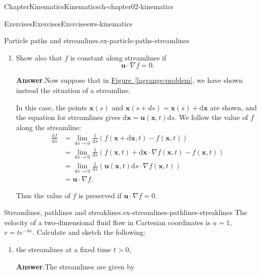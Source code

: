 \documentclass[oneside,10pt,]{book}
\newcommand{\blocktitlefont}{\relax}
\newcommand{\xreffont}{\relax}
\numberwithin{equation}{section}
\newcommand{\de}{\mathrm{d}}
\newcommand{\dd}[2]{\frac{\de#1}{\de#2}}
\newcommand{\DD}[2]{\frac{\mathrm{D}#1}{\mathrm{D}#2}}
\newcommand{\pd}[2]{\frac{\partial#1}{\partial#2}}
\newcommand{\bx}{\boldsymbol{x}}
\newcommand{\bu}{\boldsymbol{u}}
\begin{document}
\begin{chapterptx}{Chapter}{Kinematics}{}{Kinematics}{}{}{ch-chapter02-kinematics}
\begin{exercises-section}{Exercises}{Exercises}{}{Exercises}{}{}{ws-kinematics}
\begin{divisionexercise}{5}{Particle paths and streamlines.}{}{ex-particle-paths-streamlines}
\begin{enumerate}[font=\bfseries,label=(\alph*),ref=\alph*]
\begin{align*}
&=\lim_{\de t\rightarrow0}\frac1{\de t}\left(f(\bx,t)+\de\bx\cdot\nabla f(\bx,t)+\de t\pd{f}{t}(\bx,t)+\dots-f(\bx,t)\right)\\
&=\lim_{\de t\rightarrow0}\frac1{\de t}\left(\bu(\bx,t)\de t\cdot\nabla f(\bx,t)+\de t\pd{f}{t}(\bx,t)+\dots\right)\\
&=\pd{f}{t}+\bu\cdot\nabla f=\DD{f}{t},
\end{align*}
('{}'{}\(\dots\)'{}'{} denotes higher order terms). Thus the value is preserved if \(\DD{f}{t}=0\).%
\item{}Show also that \(f\) is constant along streamlines if%
\begin{equation*}
\bu\cdot\nabla f=0.
\end{equation*}
%
\par\smallskip%
\noindent\textbf{\blocktitlefont Answer}.\hypertarget{ex-particle-paths-streamlines-4-2}{}\quad{}Now suppose that in \hyperref[lagrange-problem]{Figure~{\xreffont\ref{lagrange-problem}}}, we have shown instead the situation of a streamline.%
\par
In this case, the points \(\bx(s)\) and \(\bx(s+ds)=\bx(s)+\de\bx\) are shown, and the equation for streamlines gives \(\de\bx=\bu(\bx,t)\de s\). We follow the value of \(f\) along the streamline:%
\begin{align*}
\dd{f}{s}&=\lim_{\de s\rightarrow0}\frac1{\de s}\left(f(\bx+\de\bx,t)-f(\bx,t)\right)\\
&=\lim_{\de s\rightarrow0}\frac1{\de s}\left(f(\bx,t)+\de\bx\cdot\nabla f(\bx,t)-f(\bx,t)\right)\\
&=\lim_{\de s\rightarrow0}\frac1{\de s}\left(\bu(\bx,t)\de s\cdot\nabla f(\bx,t)\right)\\
&=\bu\cdot\nabla f.
\end{align*}
%
\par
Thus the value of \(f\) is preserved if \(\bu\cdot\nabla f=0\).%
\end{enumerate}%
\end{divisionexercise}%
\begin{divisionexercise}{6}{Streamlines, pathlines and streaklines.}{}{ex-streamlines-pathlines-streaklines}%
The velocity of a two-dimensional fluid flow in Cartesian coordinates is \(u = 1\), \(v = t e^{-4x}\). Calculate and sketch the following:%
\begin{enumerate}[font=\bfseries,label=(\alph*),ref=\alph*]%
\item{}the streamlines at a fixed time \(t > 0\),%
\par\smallskip%
\noindent\textbf{\blocktitlefont Answer}.\hypertarget{ex-streamlines-pathlines-streaklines-3-2}{}\quad{}The streamlines are given by%

\end{enumerate}
\end{divisionexercise}
\end{exercises-section}
\end{chapterptx}
\end{document}
